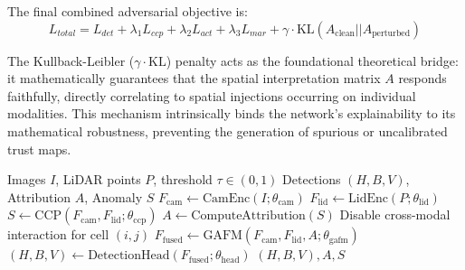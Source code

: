 The final combined adversarial objective is:
\begin{equation}
L_{total} = L_{det} + \lambda_1 L_{ccp} + \lambda_2 L_{act} + \lambda_3 L_{mar} + \gamma \cdot \text{KL}( A_{\text{clean}} || A_{\text{perturbed}} )
\end{equation}

The Kullback-Leibler ($\gamma \cdot \text{KL}$) penalty acts as the foundational theoretical bridge: it mathematically guarantees that the spatial interpretation matrix $A$ responds faithfully, directly correlating to spatial injections occurring on individual modalities. This mechanism intrinsically binds the network's explainability to its mathematical robustness, preventing the generation of spurious or uncalibrated trust maps.

\begin{algorithm}[h]
\caption{CRAF-X Inference with Explainability Output}
\begin{algorithmic}[1]
\Require Images $I$, LiDAR points $P$, threshold $\tau \in (0,1)$
\Ensure Detections $(H, B, V)$, Attribution $A$, Anomaly $S$
\State $F_{\text{cam}} \gets \text{CamEnc}(I; \theta_{\text{cam}})$
\State $F_{\text{lid}} \gets \text{LidEnc}(P; \theta_{\text{lid}})$
\State $S \gets \text{CCP}(F_{\text{cam}}, F_{\text{lid}}; \theta_{\text{ccp}})$ 
\State $A \gets \text{ComputeAttribution}(S)$
        \State Disable cross-modal interaction for cell $(i,j)$
    \EndIf
\EndFor
\State $F_{\text{fused}} \gets \text{GAFM}(F_{\text{cam}}, F_{\text{lid}}, A; \theta_{\text{gafm}})$
\State $(H, B, V) \gets \text{DetectionHead}(F_{\text{fused}}; \theta_{\text{head}})$
\State \Return $(H, B, V), A, S$
\end{algorithmic}
\end{algorithm}
